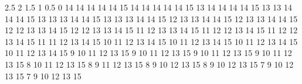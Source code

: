 


































































         2.5        2      1.5        1      0.5        0
          14       14       14       14       14       15
          14       14       14       14       14       15
          13       14       14       14       14       15
          13       13       14       14       14       15
          13       13       13       14       14       15
          13       13       13       14       14       15
          12       13       13       14       14       15
          12       13       13       14       14       15
          12       12       13       13       14       15
          12       12       13       13       14       15
          11       12       13       13       14       15
          11       12       12       13       14       15
          11       12       12       13       14       15
          11       11       12       13       14       15
          10       11       12       13       14       15
          10       11       12       13       14       15
          10       11       12       13       14       15
          10       11       12       13       14       15
           9       10       11       12       13       15
           9       10       11       12       13       15
           9       10       11       12       13       15
           9       10       11       12       13       15
           8       10       11       12       13       15
           8        9       11       12       13       15
           8        9       10       12       13       15
           8        9       10       12       13       15
           7        9       10       12       13       15
           7        9       10       12       13       15
